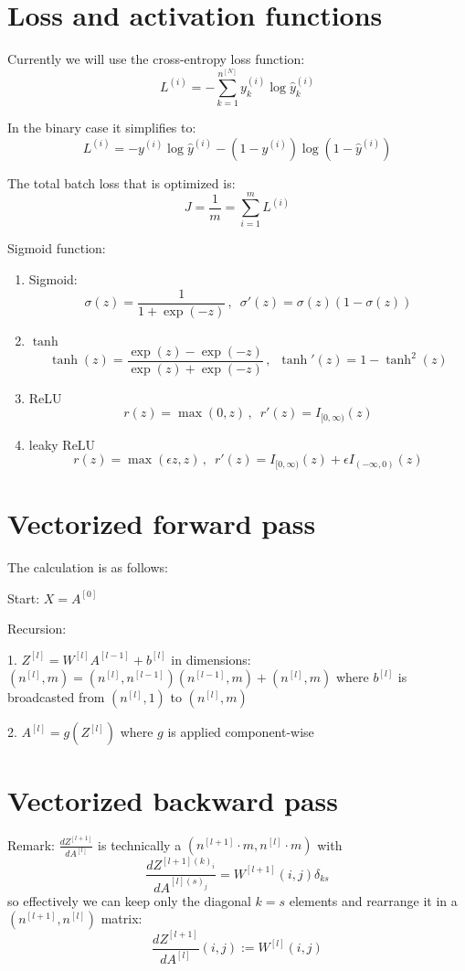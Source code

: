 \documentclass[10pt,a4paper]{article}
\begin{document}
\section{Loss and activation  functions}
\label{sec:loss}
Currently we will use the cross-entropy loss function:
\[ L^{(i)} = -\sum_{k=1}^{n^{[N]}} y^{(i)}_k \log \hat{y}^{(i)}_k   \]

In the binary case it simplifies to: 
\[ L^{(i)} = - y^{(i)} \log \hat{y}^{(i)}  - (1-y^{(i)} ) \log (1-\hat{y}^{(i)} )    \]

The total batch loss that is optimized is:
\[  J = \frac{1}{m} =\sum_{i=1}^{m} L^{(i)}     \]

Sigmoid function:
\begin{enumerate}
\item Sigmoid: 
\[\sigma(z)=\frac{1}{1+\exp(-z)}\,,\,\,\,\sigma'(z)=\sigma(z)(1-\sigma(z)) \]
\item $\tanh$ 
\[\tanh(z)=\frac{\exp(z)-\exp(-z)}{\exp(z)+\exp(-z)}\,,\,\,\,\tanh'(z)=1-\tanh^2(z) \]
\item ReLU
\[r(z)=\max(0, z)\, ,\,\,\, r'(z)=I_{[0, \infty)}(z) \]
\item leaky ReLU
\[ r(z)= \max(\epsilon z, z) \, ,\,\,\, r'(z)=I_{[0, \infty)}(z) + \epsilon I_{( -\infty, 0)}(z)  \]
\end{enumerate}

\section{Vectorized forward pass}
\label{sec:for}
The calculation is as follows:
 
Start:  $X=A^{[0]}$

Recursion:  

1. $Z^{[l]} = W^{[l]} A^{[l-1]} + b^{[l]} $  in dimensions:   $(n^{[l]},m) = (n^{[l]},n^{[l-1]}) (n^{[l-1]},m) + (n^{[l]},m)$ where $ b^{[l]}$ is broadcasted from $(n^{[l]},1)$ to  $(n^{[l]},m)$ 

2. $A^{[l]} = g(Z^{[l]})$ where $g$ is applied component-wise
 



\section{Vectorized backward pass}
\label{sec:back}
Remark: $\frac{d Z^{[l+1]} }{ d A^{[l]}}$ is technically a $(n^{[l+1]}\cdot m, n^{[l]}\cdot m)$ with
\[ \frac{d Z^{[l+1](k)_i} }{ d A^{[l](s)_j}}= W^{[l+1]}(i,j) \delta_{ks} \]
so effectively we can keep only the diagonal $k=s$ elements and rearrange it in a $(n^{[l+1]} , n^{[l]} )$ matrix:
\[ \frac{d Z^{[l+1]} }{ d A^{[l]}}(i,j) := W^{[l]}(i,j)  \]
\end{document}
